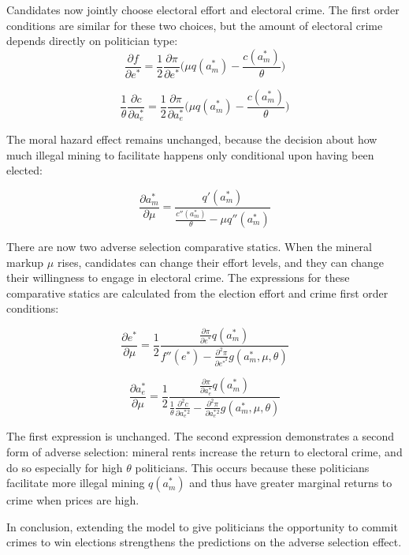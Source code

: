 Candidates now jointly choose electoral effort and electoral
crime. The first order conditions are similar for these two choices,
but the amount of electoral crime depends directly on politician type:
\begin{equation}
\frac{\partial f}{\partial e^*} = \frac{1}{2} \frac{\partial \pi}{\partial e^*}
\big( \mu q(a_m^*) - \frac{c(a_m^*)}{\theta}\big)
\end{equation}


\begin{equation}
\frac{1}{\theta} \frac{\partial c}{\partial a_e^*} = \frac{1}{2} \frac{\partial
  \pi}{\partial a_e^*} \big( \mu q(a_m^*) -
\frac{c(a_m^*)}{\theta}\big)
\end{equation}

The moral hazard effect remains unchanged, because the decision about
how much illegal mining to facilitate happens only conditional upon
having been elected:

\begin{equation}
\frac{\partial a_m^*}{\partial \mu} =
\frac{q'(a_m^*)}{\frac{c''(a_m^*)}{\theta}-\mu q''(a_m^*)}
\end{equation}
\newline

There are now two adverse selection comparative statics. When the
mineral markup $\mu$ rises, candidates can change their effort levels,
and they can change their willingness to engage in electoral
crime. The expressions
for these comparative statics are calculated from the election effort
and crime first order conditions:

\begin{equation}
\frac{\partial e^*}{\partial \mu} = \frac{1}{2} \frac{\frac{\partial
    \pi}{\partial e^*}q(a_m^*)}{f''(e^*)-\frac{\partial^2\pi}{\partial e^*^2}
  g(a_m^*,\mu,\theta)}
\end{equation}

\begin{equation}
\frac{\partial a_e^*}{\partial \mu} = \frac{1}{2} \frac{\frac{\partial
    \pi}{\partial a_e^*} q(a_m^*)}{\frac{1}{\theta} \frac{\partial^2
    c}{\partial a_e^*^2} - \frac{ \partial^2 \pi}{\partial a_e^*^2}
  g(a_m^*,\mu,\theta)}
\end{equation}

The first expression is unchanged. The second expression demonstrates
a second form of adverse selection: mineral rents increase the return
to electoral crime, and do so especially for high $\theta$
politicians. This occurs because these politicians facilitate
more illegal mining $q(a_m^*)$ and thus have greater marginal returns
to crime when prices are high.

In conclusion, extending the model to give politicians the opportunity
to commit crimes to win elections strengthens the predictions on the
adverse selection effect.
